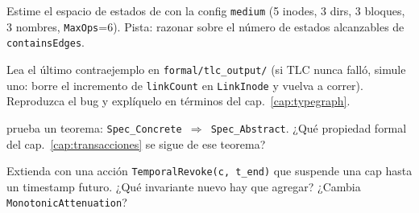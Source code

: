 \begin{ejercicio}[\dificultad{$\star\star$}]
\label{ej:tla-5}
Estime el espacio de estados de  con la
config \texttt{medium} (5 inodes, 3 dirs, 3 bloques, 3 nombres,
\texttt{MaxOps}=6). Pista: razonar sobre el número de estados
alcanzables de \texttt{containsEdges}.
\end{ejercicio}

\begin{ejercicio}[\dificultad{$\star\star$}]
\label{ej:tla-6}
Lea el último contraejemplo en \texttt{formal/tlc\_output/}
(si TLC nunca falló, simule uno: borre el incremento de \texttt{linkCount}
en \texttt{LinkInode} y vuelva a correr). Reproduzca el bug y explíquelo
en términos del cap.~\ref{cap:typegraph}.
\end{ejercicio}

\begin{ejercicio}[\dificultad{$\star\star$}]
\label{ej:tla-7}
 prueba un teorema:
\texttt{Spec\_Concrete \(\Rightarrow\) Spec\_Abstract}. ¿Qué propiedad
formal del cap.~\ref{cap:transacciones} se sigue de ese teorema?
\end{ejercicio}

\begin{ejercicio}[\dificultad{$\star\star\star$}]
\label{ej:tla-8}
Extienda  con una acción
\texttt{TemporalRevoke(c, t\_end)} que suspende una cap hasta un
timestamp futuro. ¿Qué invariante nuevo hay que agregar? ¿Cambia
\texttt{MonotonicAttenuation}?
\end{ejercicio}
